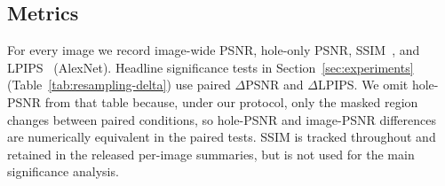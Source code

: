 \subsection{Metrics}
\label{sec:metrics}
For every image we record image-wide PSNR, hole-only PSNR, SSIM~\citep{wang2004ssim}, and LPIPS~\citep{zhang2018lpips} (AlexNet).
Headline significance tests in Section~\ref{sec:experiments} (Table~\ref{tab:resampling-delta}) use paired $\Delta$PSNR and $\Delta$LPIPS.
We omit hole-PSNR from that table because, under our protocol, only the masked region changes between paired conditions, so hole-PSNR and image-PSNR differences are numerically equivalent in the paired tests.
SSIM is tracked throughout and retained in the released per-image summaries, but is not used for the main significance analysis.
